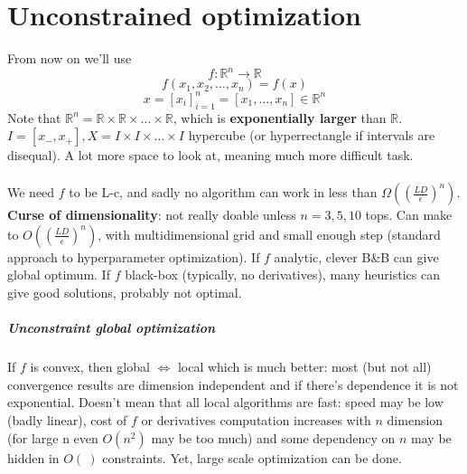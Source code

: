\documentclass[10pt]{report}
\begin{document}
\section{Unconstrained optimization}
From now on we'll use $$f:\mathbb{R}^n\rightarrow \mathbb{R}$$ $$f(x_1,x_2,\ldots,x_n) = f(x)$$ $$x = [x_i]_{i=1}^n = [x_1,\ldots,x_n]\in \mathbb{R}^n$$
Note that $\mathbb{R}^n = \mathbb{R}\times \mathbb{R} \times\ldots\times \mathbb{R}$, which is \textbf{exponentially larger} than $\mathbb{R}$.\\
$I = [x_-, x_+], X = I\times I \times\ldots\times I$ hypercube (or hyperrectangle if intervals are disequal). A lot more space to look at, meaning much more difficult task.\\\\
We need $f$ to be L-c, and sadly no algorithm can work in less than $\Omega\left(\left(\frac{LD}{\epsilon}\right)^n\right)$.\\\textbf{Curse of dimensionality}: not really doable unless $n = 3, 5, 10$ tops. Can make to $O\left(\left(\frac{LD}{\epsilon}\right)^n\right)$, with multidimensional grid and small enough step (standard approach to hyperparameter optimization). If $f$ analytic, clever B\&B can give global optimum. If $f$ black-box (typically, no derivatives), many heuristics can give good solutions, probably not optimal.
\subparagraph{Unconstraint global optimization} If $f$ is convex, then global $\Leftrightarrow$ local which is much better: most (but not all) convergence results are dimension independent and if there's dependence it is not exponential. Doesn't mean that all local algorithms are fast: speed may be low (badly linear), cost of $f$ or derivatives computation increases with $n$ dimension (for large n even $O(n^2)$ may be too much) and some dependency on $n$ may be hidden in $O(\:)$ constraints. Yet, large scale optimization can be done.
\end{document}
